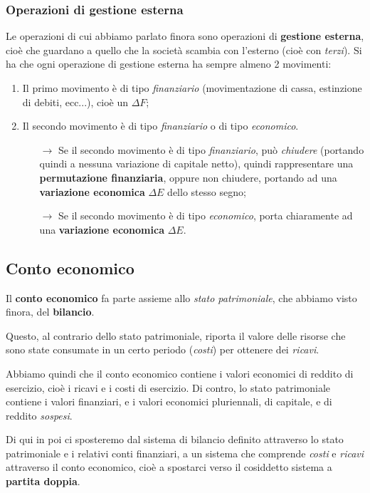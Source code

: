 \documentclass[a4paper,11pt]{article}
\begin{document}
\subsubsection{Operazioni di gestione esterna}
Le operazioni di cui abbiamo parlato finora sono operazioni di \textbf{gestione esterna}, cioè che guardano a quello che la società scambia con l'esterno (cioè con \textit{terzi}).
Si ha che ogni operazione di gestione esterna ha sempre almeno 2 movimenti:
\begin{enumerate}
	\item Il primo movimento è di tipo \textit{finanziario} (movimentazione di cassa, estinzione di debiti, ecc...), cioè un $\Delta F$;
	\item Il secondo movimento è di tipo \textit{finanziario} o di tipo \textit{economico}.
		\begin{itemize}
			\item[$\rightarrow$] Se il secondo movimento è di tipo \textit{finanziario}, può \textit{chiudere} (portando quindi a nessuna variazione di capitale netto), quindi rappresentare una \textbf{permutazione finanziaria}, oppure non chiudere, portando ad una \textbf{variazione economica} $\Delta E$ dello stesso segno;
			\item[$\rightarrow$] Se il secondo movimento è di tipo \textit{economico}, porta chiaramente ad una \textbf{variazione economica} $\Delta E$.
		\end{itemize}
\end{enumerate}

\subsection{Conto economico}
Il \textbf{conto economico} fa parte assieme allo \textit{stato patrimoniale}, che abbiamo visto finora, del \textbf{bilancio}.

Questo, al contrario dello stato patrimoniale, riporta il valore delle risorse che sono state consumate in un certo periodo (\textit{costi}) per ottenere dei \textit{ricavi}.

Abbiamo quindi che il conto economico contiene i valori economici di reddito di esercizio, cioè i ricavi e i costi di esercizio.
Di contro, lo stato patrimoniale contiene i valori finanziari, e i valori economici pluriennali, di capitale, e di reddito \textit{sospesi}.

Di qui in poi ci sposteremo dal sistema di bilancio definito attraverso lo stato patrimoniale e i relativi conti finanziari, a un sistema che comprende \textit{costi} e \textit{ricavi} attraverso il conto economico, cioè a spostarci verso il cosiddetto sistema a \textbf{partita doppia}.
\end{document}
